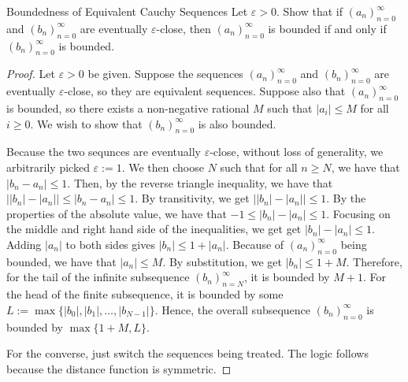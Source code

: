\begin{problem}{Boundedness of Equivalent Cauchy Sequences}
    Let $\varepsilon > 0.$ 
    Show that if $(a_n)_{n=0}^\infty$ and $( b_n)_{n=0}^\infty$ are eventually $\varepsilon$-close,
    then $(a_n)_{n=0}^\infty$ is bounded if and only if $(b_n)_{n=0}^\infty$ is bounded.
\end{problem}
\begin{proof}
    Let $\varepsilon > 0$ be given.
    Suppose the sequences $(a_n)_{n=0}^\infty$ and $(b_n)_{n=0}^\infty$ are eventually $\varepsilon$-close, so they are equivalent sequences.
    Suppose also that $(a_n)_{n=0}^\infty$ is bounded, so there exists a non-negative rational $M$ such that $|a_i| \leq M$ for all $i \geq 0.$
    We wish to show that $(b_n)_{n=0}^\infty$ is also bounded.

    Because the two sequnces are eventually $\varepsilon$-close, without loss of generality, we arbitrarily picked $\varepsilon := 1$.
    We then choose $N$ such that for all $n \geq N$, we have that $|b_n - a_n| \leq 1.$
    Then, by the reverse triangle inequality, we have that $\big| |b_n| - |a_n| \big| \leq |b_n - a_n| \leq 1.$
    By transitivity, we get $\big| |b_n| - |a_n| \big| \leq 1$. 
    By the properties of the absolute value, we have that $-1 \leq |b_n| - |a_n| \leq 1.$ 
    Focusing on the middle and right hand side of the inequalities, we get get $|b_n| - |a_n| \leq 1.$
    Adding $|a_n|$ to both sides gives $|b_n| \leq 1 + |a_n|$.
    Because of $(a_n)_{n=0}^\infty$ being bounded, we have that $|a_n| \leq M$.
    By substitution, we get $|b_n| \leq 1 + M.$
    Therefore, for the tail of the infinite subsequence $(b_n)_{n=N}^\infty$, it is bounded by $M + 1$.
    For the head of the finite subsequence, it is bounded by some $L:= \max \{|b_0|, |b_1|, \dots, |b_{N-1}| \}$.
    Hence, the overall subsequence $(b_n)_{n=0}^\infty$ is bounded by $\max \{1 + M, L\}.$

    For the converse, just switch the sequences being treated. The logic follows because the distance function is symmetric.
\end{proof}
